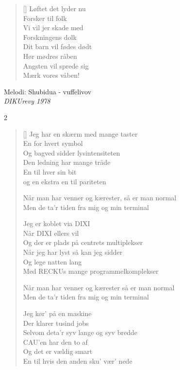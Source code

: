 {\begin{multicols}
\begin{verse}[\versewidth]
Løftet det lyder nu\\
Forsker til folk\\
Vi vil jer skade med\\
Forskningens dolk\\
Dit barn vil fødes dødt\\
Hør mødres råben\\
Angsten vil sprede sig\\
Mærk vores våben!
\end{verse}
\end{multicols}


\newpage

{Melodi: Shubidua - vuffelivov}\\[.2em]
{\small\itshape DIKUrevy 1978}
\begin{multicols}2
\settowidth{\versewidth}{Når man har venner og kærester, så er man normal}
\begin{verse}[\versewidth]
Jeg har en skærm med mange taster\\
En for hvert symbol\\
Og bagved sidder lysintensiteten\\
Den ledning har mange tråde\\
En til hver sin bit\\
og en ekstra en til pariteten

Når man har venner og kærester, så er man normal\\
Men de ta'r tiden fra mig og min terminal

Jeg er koblet via DIXI\\
Når DIXI ellers vil\\
Og der er plads på centrets multiplekser\\
Når jeg har lyst så kan jeg sidder\\
Og lege natten lang\\
Med RECKUs mange programmelkomplekser

Når man har venner og kærester så er man normal\\
Men de ta'r tiden fra mig og min terminal

Jeg kør' på en maskine\\
Der klarer tusind jobs\\
Selvom deta'r syv lange og syv bredde\\
CAU'en har den to af\\
Og det er vældig smart\\
En til hvis den anden sku' vær' nede


\end{verse}
\end{multicols}}
